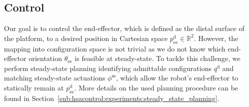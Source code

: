 \subsection{Control}\label{sub:hsacontrol:methodology:control}
Our goal is to control the end-effector, which is defined as the distal surface of the platform, to a desired position in Cartesian space $p_\mathrm{ee}^\mathrm{d} \in \mathbb{R}^2$. 
However, the mapping into configuration space is not trivial as we do not know which end-effector orientation $\theta_\mathrm{ee}$ is feasible at steady-state. 
To tackle this challenge, we perform steady-state planning identifying admittable configurations $q^\mathrm{d}$ and matching steady-state actuations $\phi^\mathrm{ss}$, which allow the robot's end-effector to statically remain at $p_\mathrm{ee}^\mathrm{d}$. More details on the used planning procedure can be found in Section~\ref{sub:hsacontrol:experiments:steady_state_planning}.

